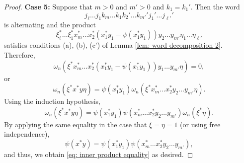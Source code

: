 \documentclass[10pt,a4paper]{amsart}
\begin{document}
\begin{proof}
\textbf{Case 5:} Suppose that $m > 0$ and $m' > 0$ and $k_1 = k_1'$.  Then the word
\[
j_\ell \dots j_1 k_m \dots k_1 k_2' \dots k_{m'}' j_1' \dots j_{\ell'}'
\]
is alternating and the product
\[
\xi_\ell^* \dots \xi_1^* x_m^* \dots x_2^* (x_1^*y_1 - \psi(x_1^*y_1)) y_2 \dots y_{m'} \eta_1 \dots \eta_{\ell'}
\]
satisfies conditions (a), (b), (c') of Lemma \ref{lem: word decomposition 2}.  Therefore,
\[
\omega_n(\xi^* x_m^* \dots x_2^* (x_1^*y_1 - \psi(x_1^*y_1)) y_1 \dots y_{m'} \eta) = 0,
\]
or
\[
\omega_n(\xi^* x^* y \eta) = \psi(x_1^*y_1) \omega_n(\xi^* x_m^* \dots x_2^* y_2 \dots y_{m'} \eta).
\]
Using the induction hypothesis,
\[
\omega_n(\xi^* x^* y \eta) = \psi(x_1^*y_1) \psi(x_m^* \dots x_2^* y_2 \dots y_{m'}) \omega_n(\xi^*\eta).
\]
By applying the same equality in the case that $\xi = \eta = 1$ (or using free independence),
\[
\psi(x^*y) = \psi(x_1^*y_1) \psi(x_m^* \dots x_2^* y_2 \dots y_{m'}),
\]
and thus, we obtain \eqref{eq: inner product equality} as desired.
\end{proof}
\end{document}
